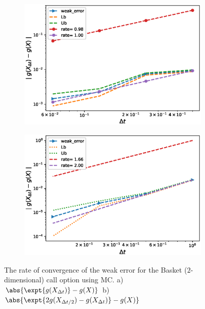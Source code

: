 \begin{figure}[h!]
	\centering
	\begin{subfigure}{.35\textwidth}
		\centering
		\includegraphics[width=1\linewidth]{./figures/weak_error_rates_basket_2d/without_richardson/weak_convergence_order_basket_option_2d_1_relative_M_4_10_7_plain}
		\caption{}
		\label{fig:sub3}
	\end{subfigure}%
	\begin{subfigure}{.35\textwidth}
		\centering
		\includegraphics[width=1\linewidth]{./figures/weak_error_rates_basket_2d/with_richardson/weak_convergence_order_basket_option_2d_1_richardson_relative_M_4_10_7_plain}
		\caption{}
		\label{fig:sub4}
	\end{subfigure}
	
	\caption{The rate of convergence of the weak error for the Basket ($2$-dimensional) call option using MC. a) $\abs{\expt{g(X_{\Delta t})}-g(X)}$  b) $\abs{\expt{2 g(X_{\Delta t/2}) -g(X_{\Delta t})}-g(X)}$}
	\label{fig:Weak_rate_basket_2d}
\end{figure}






